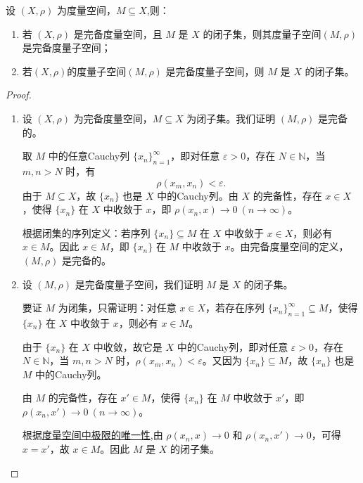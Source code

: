 \documentclass[../../main.tex]{subfiles}%
\begin{document}
\begin{proposition}\label{proposition:完备度量空间的子空间等价于闭集}
设 $(X, \rho)$ 为度量空间，$M \subseteq X$,则：
\begin{enumerate}[(1)]
\item\label{proposition:完备度量空间的子空间等价于闭集-1} 若 $(X, \rho)$ 是完备度量空间，且 $M$ 是 $X$ 的闭子集，则其度量子空间$(M, \rho)$ 是完备度量子空间；
\item\label{proposition:完备度量空间的子空间等价于闭集-2} 若$(X, \rho)$的度量子空间$(M, \rho)$ 是完备度量子空间，则 $M$ 是 $X$ 的闭子集。
\end{enumerate}
\end{proposition}
\begin{proof}
\begin{enumerate}[(1)]
\item 设 $(X, \rho)$ 为完备度量空间，$M \subseteq X$ 为闭子集。我们证明 $(M, \rho)$ 是完备的。

取 $M$ 中的任意Cauchy列 $\{x_n\}_{n=1}^\infty$，即对任意 $\varepsilon > 0$，存在 $N \in \mathbb{N}$，当 $m,n > N$ 时，有
\[
\rho(x_m, x_n) < \varepsilon.
\]
由于 $M \subseteq X$，故 $\{x_n\}$ 也是 $X$ 中的Cauchy列。由 $X$ 的完备性，存在 $x \in X$，使得 $\{x_n\}$ 在 $X$ 中收敛于 $x$，即 $\rho(x_n, x) \to 0 \ (n \to \infty)$。

根据闭集的序列定义：若序列 $\{x_n\} \subseteq M$ 在 $X$ 中收敛于 $x \in X$，则必有 $x \in M$。因此 $x \in M$，即 $\{x_n\}$ 在 $M$ 中收敛于 $x$。由完备度量空间的定义，$(M, \rho)$ 是完备的。

\item 设 $(M, \rho)$ 是完备度量子空间，我们证明 $M$ 是 $X$ 的闭子集。

要证 $M$ 为闭集，只需证明：对任意 $x \in X$，若存在序列 $\{x_n\}_{n=1}^\infty \subseteq M$，使得 $\{x_n\}$ 在 $X$ 中收敛于 $x$，则必有 $x \in M$。

由于 $\{x_n\}$ 在 $X$ 中收敛，故它是 $X$ 中的Cauchy列，即对任意 $\varepsilon > 0$，存在 $N \in \mathbb{N}$，当 $m,n > N$ 时，$\rho(x_m, x_n) < \varepsilon$。又因为 $\{x_n\} \subseteq M$，故 $\{x_n\}$ 也是 $M$ 中的Cauchy列。

由 $M$ 的完备性，存在 $x' \in M$，使得 $\{x_n\}$ 在 $M$ 中收敛于 $x'$，即 $\rho(x_n, x') \to 0 \ (n \to \infty)$。

根据\hyperref[theorem:度量空间中收敛序列极限的唯一性和序列有界性]{度量空间中极限的唯一性},由 $\rho(x_n, x) \to 0$ 和 $\rho(x_n, x') \to 0$，可得 $x = x'$，故 $x \in M$。因此 $M$ 是 $X$ 的闭子集。
\end{enumerate}

\end{proof}
\end{document}
